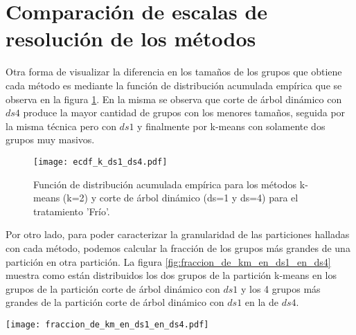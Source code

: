 \section{Comparación de escalas de resolución de los métodos}
Otra forma de visualizar la diferencia en los tamaños de los grupos que obtiene cada método es mediante la función de distribución acumulada empírica que se observa en la figura \ref{fig:ecdf_k_ds1_ds4}. En la misma se observa que corte de árbol dinámico con $ds4$ produce la mayor cantidad de grupos con los menores tamaños, seguida por la misma técnica pero con $ds1$ y finalmente por k-means con solamente dos grupos muy masivos.
\begin{figure}[h]
    \centering
    \texttt{[image: ecdf\_k\_ds1\_ds4.pdf]}
    \caption{Función de distribución acumulada empírica para los métodos k-means (k=2) y corte de árbol dinámico (ds=1 y ds=4) para el tratamiento 'Frío'.}
    \label{fig:ecdf_k_ds1_ds4}
\end{figure}
Por otro lado, para poder caracterizar la granularidad de las particiones halladas con cada método, podemos calcular la fracción de los grupos más grandes de una partición en otra partición. La figura \ref{fig:fraccion_de_km_en_ds1_en_ds4} muestra como están distribuidos los dos grupos de la partición k-means en los grupos de la partición corte de árbol dinámico con $ds1$ y los 4 grupos más grandes de la partición corte de árbol dinámico con $ds1$ en la de $ds4$.
\begin{sidewaysfigure}
    \centering
    \texttt{[image: fraccion\_de\_km\_en\_ds1\_en\_ds4.pdf]}
    \caption{Fracción de grupos de una partición más fina dentro de grupos en una partición más gruesa para el tratamiento 'Frío', con $ds1$, $ds4$ y k-means. En rojo, aquellos subgrupos que están contenidos en más de un 50\% en el grupo. La linea punteada marca el porcentaje del grupo que representa el total del subgrupo.}
    \label{fig:fraccion_de_km_en_ds1_en_ds4}
\end{sidewaysfigure}
    

